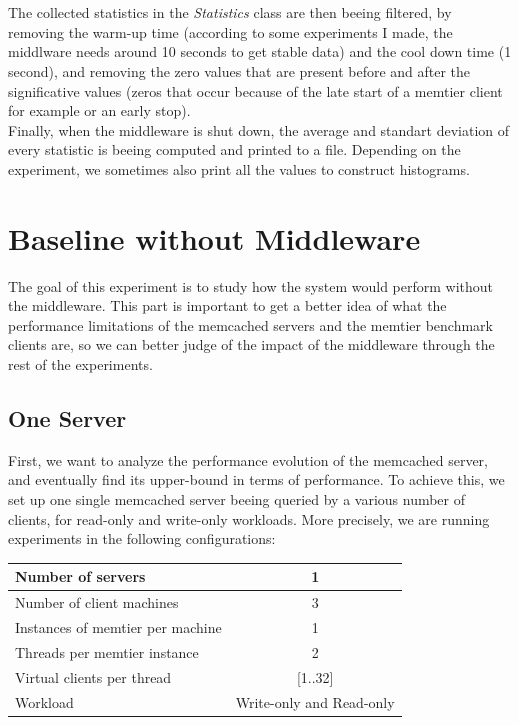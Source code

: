\documentclass[11pt,a4paper]{article}
\begin{document}
\\\\
The collected statistics in the \textit{Statistics} class are then beeing filtered, by removing the warm-up time (according to some experiments I made, the middlware needs around 10 seconds to get stable data) and the cool down time (1 second), and removing the zero values that are present before and after the significative values (zeros that occur because of the late start of a memtier client for example or an early stop). 
\\
Finally, when the middleware is shut down, the average and standart deviation of every statistic is beeing computed and printed to a file. Depending on the experiment, we sometimes also print all the values to construct histograms.
\newpage  
\section{Baseline without Middleware}
The goal of this experiment is to study how the system would perform without the middleware. This part is important to get a better idea of what the performance limitations of the memcached servers and the memtier benchmark clients are, so we can better judge of the impact of the middleware through the rest of the experiments. 

\subsection{One Server}

First, we want to analyze the performance evolution of the memcached server, and eventually find its upper-bound in terms of performance. To achieve this, we set up one single memcached server beeing queried by a various number of clients, for read-only and write-only workloads. More precisely, we are running experiments in the following configurations:
\begin{center}
	\scriptsize{
		\begin{tabular}{|l|c|}
			\hline Number of servers                & 1                        \\ 
			\hline Number of client machines        & 3                        \\ 
			\hline Instances of memtier per machine & 1                        \\ 
			\hline Threads per memtier instance     & 2                        \\
			\hline Virtual clients per thread       & [1..32]                  \\ 
			\hline Workload                         & Write-only and Read-only \\
			\hline 
		\end{tabular}
	} 
\end{center}
\end{document}

